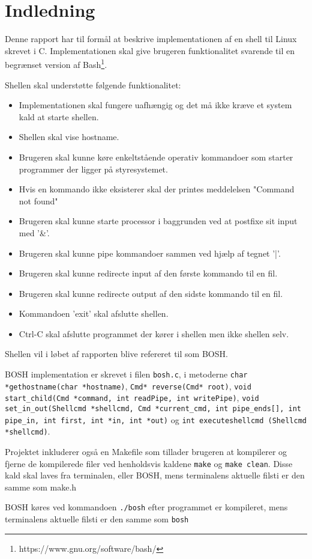 \section{Indledning}
Denne rapport har til formål at beskrive implementationen af en shell til Linux skrevet i C. Implementationen skal give brugeren funktionalitet svarende til en begrænset version af Bash\footnote{https://www.gnu.org/software/bash/}. 

Shellen skal understøtte følgende funktionalitet:
\begin{itemize}
	\item Implementationen skal fungere uafhængig og det må ikke kræve et system kald at starte shellen.
	\item Shellen skal vise hostname.
	\item Brugeren skal kunne køre enkeltstående operativ kommandoer som starter programmer der ligger på styresystemet.
	\item Hvis en kommando ikke eksisterer skal der printes meddelelsen "Command not found"
	\item Brugeren skal kunne starte processor i baggrunden ved at postfixe sit input med '\&'.
	\item Brugeren skal kunne pipe kommandoer sammen ved hjælp af tegnet '|'.
	\item Brugeren skal kunne redirecte input af den første kommando til en fil.
	\item Brugeren skal kunne redirecte output af den sidste kommando til en fil.
	\item Kommandoen 'exit' skal afslutte shellen.
	\item Ctrl-C skal afslutte programmet der kører i shellen men ikke shellen selv.
\end{itemize}

Shellen vil i løbet af rapporten blive refereret til som BOSH.

BOSH implementation er skrevet i filen \verb+bosh.c+, i metoderne \verb+char *gethostname(char *hostname)+, \verb+Cmd* reverse(Cmd* root)+, \verb+void start_child(Cmd *command, int readPipe, int writePipe)+, \verb+void set_in_out(Shellcmd *shellcmd, Cmd *current_cmd, int pipe_ends[], int pipe_in, int first, int *in, int *out)+ og \verb+int executeshellcmd (Shellcmd *shellcmd)+. 

Projektet inkluderer også en Makefile som tillader brugeren at kompilerer og fjerne de kompilerede filer ved henholdsvis kaldene \verb+make+ og \verb+make clean+. Disse kald skal laves fra terminalen, eller BOSH, mens terminalens aktuelle filsti er den samme som make.h

BOSH køres ved kommandoen \verb+./bosh+ efter programmet er kompileret, mens terminalens aktuelle filsti er den samme som \verb+bosh+
